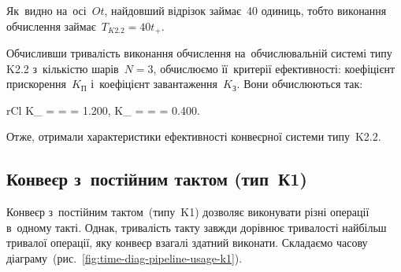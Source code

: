 \documentclass[
	a4paper,
	oneside,
	BCOR = 10mm,
	DIV = 12,
	12pt,
	headings = normal,
]{scrartcl}
\begin{document}
				Як~видно на~осі~$Ot$, найдовший відрізок займає~40 одиниць, тобто виконання обчислення займає~$T_{K2.2} = 40 t_{+}$.

				Обчисливши тривалість виконання обчислення на~обчислювальній системі типу K2.2 з~кількістю шарів~$N = 3$, обчислюємо її~критерії ефективності: коефіцієнт прискорення~$K_{\text{П}}$ і~коефіцієнт завантаження~$K_{\text{З}}$. Вони обчислюються так:
				\begin{IEEEeqnarray*}{rCl}
					K_{} =  =  = \num{1.200}, \quad
					K_{} =  =  = \num{0.400}.
				\end{IEEEeqnarray*}
				Отже, отримали характеристики ефективності конвеєрної системи типу~K2.2.

			\subsection{Конвеєр з~постійним тактом (тип~К1)}
				Конвеєр з~постійним тактом~(типу~K1) дозволяє виконувати різні операції в~одному такті. Однак, тривалість такту завжди дорівнює тривалості найбільш тривалої операції, яку конвеєр взагалі здатний виконати. Складаємо часову діаграму~(рис.~\ref{fig:time-diag-pipeline-usage-k1}).
\end{document}
